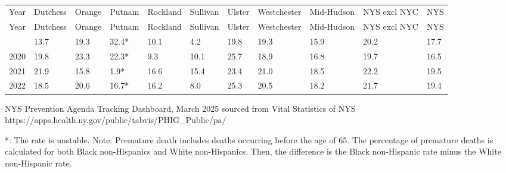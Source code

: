 \documentclass[
  english,
  letterpaper,
]{report}
\begin{document}
\begin{longtable}[]{@{}lllllllllll@{}}

\caption{\label{tbl-premature-death-percent-diff-bnhvswnh}Premature
Deaths, Percentage Difference Between Black Non-Hispanics and White
Non-Hispanics, 2019--2022}

\tabularnewline

\caption{}\label{T_9f7b2}\tabularnewline
\toprule\noalign{}
Year & Dutchess & Orange & Putnam & Rockland & Sullivan & Ulster &
Westchester & Mid-Hudson & NYS excl NYC & NYS \\
\midrule\noalign{}
\endfirsthead
\toprule\noalign{}
Year & Dutchess & Orange & Putnam & Rockland & Sullivan & Ulster &
Westchester & Mid-Hudson & NYS excl NYC & NYS \\
\midrule\noalign{}
\endhead
\bottomrule\noalign{}
\endlastfoot
2019 & 13.7 & 19.3 & 32.4* & 10.1 & 4.2 & 19.8 & 19.3 & 15.9 & 20.2 &
17.7 \\
2020 & 19.8 & 23.3 & 22.3* & 9.3 & 10.1 & 25.7 & 18.9 & 16.8 & 19.7 &
16.5 \\
2021 & 21.9 & 15.8 & 1.9* & 16.6 & 15.4 & 23.4 & 21.0 & 18.5 & 22.2 &
19.5 \\
2022 & 18.5 & 20.6 & 16.7* & 16.2 & 8.0 & 25.3 & 20.5 & 18.2 & 21.7 &
19.4 \\

\end{longtable}

\begin{tcolorbox}[enhanced jigsaw, breakable, leftrule=.75mm, title=\textcolor{quarto-callout-note-color}{\faInfo}\hspace{0.5em}{Source}, bottomrule=.15mm, opacityback=0, left=2mm, colback=white, bottomtitle=1mm, coltitle=black, colbacktitle=quarto-callout-note-color!10!white, colframe=quarto-callout-note-color-frame, opacitybacktitle=0.6, toptitle=1mm, titlerule=0mm, arc=.35mm, rightrule=.15mm, toprule=.15mm]

NYS Prevention Agenda Tracking Dashboard, March 2025 sourced from Vital
Statistics of NYS
https://apps.health.ny.gov/public/tabvis/PHIG\_Public/pa/

\end{tcolorbox}

\begin{tcolorbox}[enhanced jigsaw, breakable, leftrule=.75mm, title=\textcolor{quarto-callout-note-color}{\faInfo}\hspace{0.5em}{Note}, bottomrule=.15mm, opacityback=0, left=2mm, colback=white, bottomtitle=1mm, coltitle=black, colbacktitle=quarto-callout-note-color!10!white, colframe=quarto-callout-note-color-frame, opacitybacktitle=0.6, toptitle=1mm, titlerule=0mm, arc=.35mm, rightrule=.15mm, toprule=.15mm]

*: The rate is unstable. Note: Premature death includes deaths occurring
before the age of 65. The percentage of premature deaths is calculated
for both Black non-Hispanics and White non-Hispanics. Then, the
difference is the Black non-Hispanic rate minus the White non-Hispanic
rate.

\end{tcolorbox}
\end{document}

